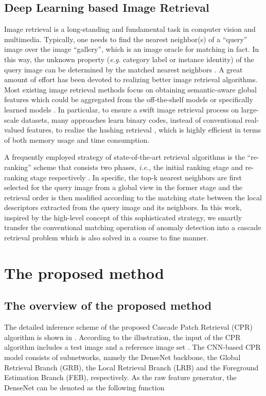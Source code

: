 \documentclass[lettersize,journal]{IEEEtran}
\begin{document}
\subsection{Deep Learning based Image Retrieval}
\label{subsec:retrieval}

Image retrieval is a long-standing and fundamental task in computer vision and
multimedia.  Typically, one needs to find the nearest neighbor(s) of a ``query'' image
over the image ``gallery'', which is an image oracle for matching in fact. In this way,
the unknown property (\emph{e.g.} category label or instance identity) of the query
image can be determined by the matched nearest neighbors \cite{chen-survey-2022deep}. A great
amount of effort has been devoted to realizing better image retrieval algorithms. Most
existing image retrieval methods focus on obtaining semantic-aware global features which
could be aggregated from the off-the-shelf models \cite{2015Cross, 2015Exploiting,
  2017Unsupervised} or specifically learned models \cite{2015NetVLAD, 2016Deep,
  2021Instance}. In particular, to ensure a swift image retrieval process on large-scale
datasets, many approaches learn binary codes, instead of conventional real-valued
features, to realize the hashing retrieval \cite{2016Accurate, Mor2016Nested, 2017Deep,
  2018Supervised}, which is highly efficient in terms of both memory usage and time
consumption.

A frequently employed strategy of state-of-the-art retrieval algorithms is the
``re-ranking'' scheme that consists two phases, \emph{i.e.}, the initial ranking stage
and re-ranking stage respectively \cite{2016Image, 2018Detect, 2021Instance}. In
specific, the top-k nearest neighbors are first selected for the query image from a
global view in the former stage and the retrieval order is then modified according to
the matching state between the local descriptors extracted from the query image and its
neighbors. In this work, inspired by the high-level concept of this sophisticated
strategy, we smartly transfer the conventional matching operation of anomaly detection
into a cascade retrieval problem which is also solved in a coarse to fine manner.

\section{The proposed method}
\label{sec:method}


\subsection{The overview of the proposed method}
\label{subsec:alg_overview}
The detailed inference scheme of the proposed Cascade Patch Retrieval (CPR) algorithm is
shown in .
According to the illustration, the input of the CPR algorithm includes a test image
 and a reference image set
. The CNN-based CPR model consists of  subnetworks, namely
the DenseNet \cite{huang2018densely} backbone, the Global Retrieval Branch (GRB), the
Local Retrieval Branch (LRB) and the Foreground Estimation Branch (FEB), respectively. As
the raw feature generator, the DenseNet can be denoted as the following function
\end{document}
